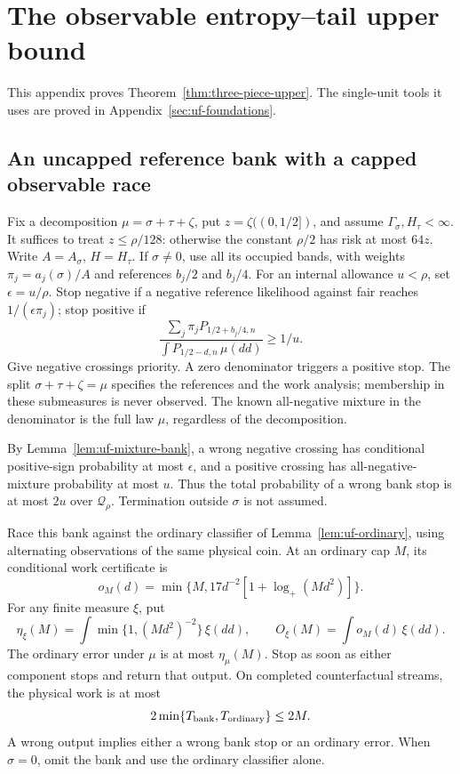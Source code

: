 \section{The observable entropy--tail upper bound}\label{sec:entropy-tail-upper}
This appendix proves Theorem~\ref{thm:three-piece-upper}. The
single-unit tools it uses are proved in Appendix~\ref{sec:uf-foundations}.

\subsection{An uncapped reference bank with a capped observable race}

Fix a decomposition $\mu=\sigma+\tau+\zeta$, put
$z=\zeta((0,1/2])$, and assume $\Gamma_\sigma,H_\tau<\infty$.
It suffices to treat $z\le\rho/128$: otherwise the constant $\rho/2$
has risk at most $64z$. Write $A=A_\sigma$, $H=H_\tau$.
If $\sigma\ne0$, use all its occupied bands, with weights
$\pi_j=a_j(\sigma)/A$ and references $b_j/2$ and $b_j/4$.
For an internal allowance $u<\rho$, set $\epsilon=u/\rho$.
Stop negative if a negative reference likelihood against fair reaches
$1/(\epsilon\pi_j)$; stop positive if
\begin{equation}\label{eq:split-bank-ratio}
 \frac{\sum_j\pi_jP_{1/2+b_j/4,n}}
      {\int P_{1/2-d,n}\,\mu(dd)}\ge1/u.
\end{equation}
Give negative crossings priority. A zero denominator triggers a positive
stop. The split $\sigma+\tau+\zeta=\mu$ specifies the references and the
work analysis; membership in these submeasures is never observed.
The known all-negative mixture in the denominator is the full law
$\mu$, regardless of the decomposition.

By Lemma~\ref{lem:uf-mixture-bank}, a wrong negative crossing has
conditional positive-sign probability at most $\epsilon$, and a positive
crossing has all-negative-mixture probability at most $u$. Thus the total
probability of a wrong bank stop is at most $2u$ over $\mathcal Q_\rho$.
Termination outside $\sigma$ is not assumed.

Race this bank against the ordinary classifier of Lemma~\ref{lem:uf-ordinary}, using
alternating observations of the same physical coin. At an ordinary cap
$M$, its conditional work certificate is
\[
 o_M(d)=\min\{M,17d^{-2}[1+\log_+(Md^2)]\}.
\]
For any finite measure $\xi$, put
\[
 \eta_\xi(M)=\int\min\{1,(Md^2)^{-2}\}\,\xi(dd),\qquad
 O_\xi(M)=\int o_M(d)\,\xi(dd).
\]
The ordinary error under $\mu$ is at most $\eta_\mu(M)$.
Stop as soon as either component stops and return that output.
On completed counterfactual streams, the physical work is at most
\[
 2\min\{T_{\rm bank},T_{\rm ordinary}\}\le2M.
\]
A wrong output implies either a wrong bank stop or an ordinary error.
When $\sigma=0$, omit the bank and use the ordinary classifier alone.

